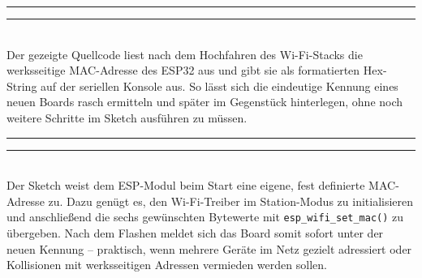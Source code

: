 \documentclass[a4paper,12pt]{article}
\begin{document}
\noindent\rule{\linewidth}{0.4pt}  %

\noindent\rule{\linewidth}{0.4pt}  %
\\[-0.8em]

Der gezeigte Quellcode liest nach dem Hochfahren des Wi-Fi-Stacks die werksseitige MAC-Adresse des ESP32 aus und gibt sie als formatierten Hex-String auf der seriellen Konsole aus. So lässt sich die eindeutige Kennung eines neuen Boards rasch ermitteln und später im Gegenstück hinterlegen, ohne noch weitere Schritte im Sketch ausführen zu müssen.

\noindent\rule{\linewidth}{0.4pt}  %

\noindent\rule{\linewidth}{0.4pt}  %
\\[-0.8em]

Der Sketch weist dem ESP-Modul beim Start eine eigene, fest definierte MAC-Adresse zu. Dazu genügt es, den Wi-Fi-Treiber im Station-Modus zu initialisieren und anschließend die sechs gewünschten Bytewerte mit \verb|esp_wifi_set_mac()| zu übergeben. Nach dem Flashen meldet sich das Board somit sofort unter der neuen Kennung – praktisch, wenn mehrere Geräte im Netz gezielt adressiert oder Kollisionen mit werksseitigen Adressen vermieden werden sollen.
\end{document}
